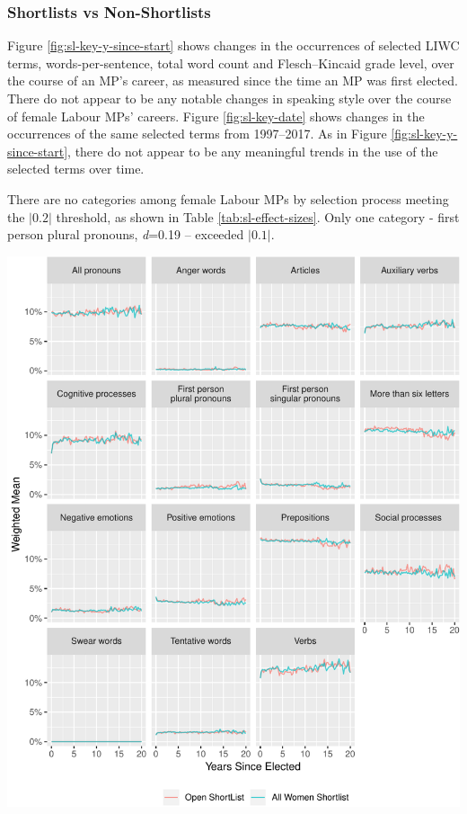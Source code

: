 \documentclass[]{article}
\let\origfigure\figure
\let\endorigfigure\endfigure
\renewenvironment{figure}[1][2] {
    \expandafter\origfigure\expandafter[H]
} {
    \endorigfigure
}
\theoremstyle{definition}
\theoremstyle{definition}
\theoremstyle{definition}
\theoremstyle{remark}
\begin{document}
\hypertarget{shortlists-vs-non-shortlists}{%
\subsubsection{Shortlists vs
Non-Shortlists}\label{shortlists-vs-non-shortlists}}

Figure \ref{fig:sl-key-y-since-start} shows changes in the occurrences
of selected LIWC terms, words-per-sentence, total word count and
Flesch--Kincaid grade level, over the course of an MP's career, as
measured since the time an MP was first elected. There do not appear to
be any notable changes in speaking style over the course of female
Labour MPs' careers. Figure \ref{fig:sl-key-date} shows changes in the
occurrences of the same selected terms from 1997--2017. As in Figure
\ref{fig:sl-key-y-since-start}, there do not appear to be any meaningful
trends in the use of the selected terms over time.

There are no categories among female Labour MPs by selection process
meeting the \(|0.2|\) threshold, as shown in Table
\ref{tab:sl-effect-sizes}. Only one category - first person plural
pronouns, \emph{d}=0.19 -- exceeded \(|0.1|\).

\begin{figure}
\centering
\includegraphics{methodology_files/figure-latex/sl-key-y-since-start-1.pdf}
\caption{\label{fig:sl-key-y-since-start}Occurrence of selected LIWC terms,
by time as MP}
\end{figure}
\end{document}
